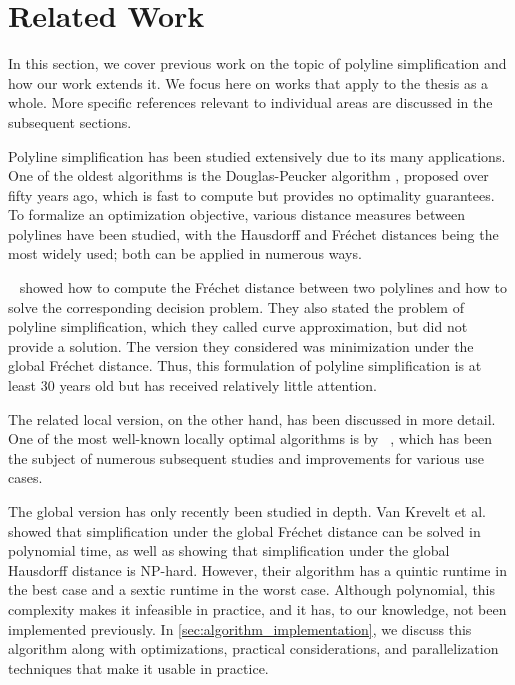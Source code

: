 \section{Related Work}
\label{sec:related_work}

In this section, we cover previous work on the topic of polyline simplification and how our work extends it. We focus here on works that apply to the thesis as a whole. More specific references relevant to individual areas are discussed in the subsequent sections.

Polyline simplification has been studied extensively due to its many applications. One of the oldest algorithms is the Douglas-Peucker algorithm \cite{algorithms_reduction_number_points_caricature}, proposed over fifty years ago, which is fast to compute but provides no optimality guarantees. To formalize an optimization objective, various distance measures between polylines have been studied, with the Hausdorff and Fréchet distances being the most widely used; both can be applied in numerous ways.

\citeauthor{computing_the_frechet_distance_between_two_polygonal_curves}~\cite{computing_the_frechet_distance_between_two_polygonal_curves} showed how to compute the Fréchet distance between two polylines and how to solve the corresponding decision problem. They also stated the problem of polyline simplification, which they called curve approximation, but did not provide a solution. The version they considered was minimization under the global Fréchet distance. Thus, this formulation of polyline simplification is at least 30 years old but has received relatively little attention.

The related local version, on the other hand, has been discussed in more detail. One of the most well-known locally optimal algorithms is by \citeauthor{computational_geometric_methods_for_polygonal_approximations_of_a_curve}~\cite{computational_geometric_methods_for_polygonal_approximations_of_a_curve}, which has been the subject of numerous subsequent studies and improvements for various use cases.

The global version has only recently been studied in depth. Van Krevelt et al.~\cite{on_optimal_polyline_simplification_using_the_hausdorff_and_frechet_distance} showed that simplification under the global Fréchet distance can be solved in polynomial time, as well as showing that simplification under the global Hausdorff distance is NP-hard. However, their algorithm has a quintic runtime in the best case and a sextic runtime in the worst case. Although polynomial, this complexity makes it infeasible in practice, and it has, to our knowledge, not been implemented previously. In \cref{sec:algorithm_implementation}, we discuss this algorithm along with optimizations, practical considerations, and parallelization techniques that make it usable in practice.

